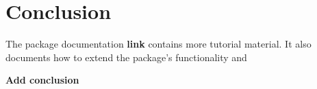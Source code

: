 \documentclass[article]{jss}
\begin{document}



 

 

% 
% 
%  

\section{Conclusion}

The package documentation \textbf{link} contains more tutorial material. It also documents how to extend the package's functionality and 

\textbf{Add conclusion}


\end{document}
